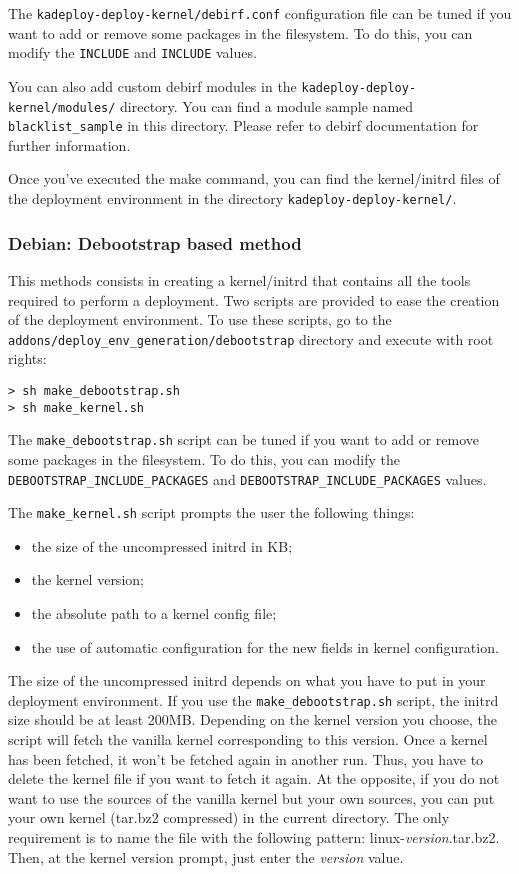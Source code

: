\documentclass[a4wide,10pt,oneside]{book}
\begin{document}
The \texttt{kadeploy-deploy-kernel/debirf.conf} configuration file can be tuned if you want to add or remove some packages in the filesystem. To do this, you can modify the \texttt{INCLUDE} and \texttt{INCLUDE} values.

You can also add custom debirf modules in the \texttt{kadeploy-deploy-kernel/modules/} directory. You can find a module sample named \texttt{blacklist\_sample} in this directory. Please refer to debirf documentation for further information.

Once you've executed the make command, you can find the kernel/initrd files of the deployment environment in the directory \texttt{kadeploy-deploy-kernel/}.

\subsubsection{Debian: Debootstrap based method}
This methods consists in creating a kernel/initrd that contains all the tools required to perform a deployment. Two scripts are provided to ease the creation of the deployment environment. To use these scripts, go to the \texttt{addons/deploy\_env\_generation/debootstrap} directory and execute with root rights:
\begin{small}
\begin{verbatim}
> sh make_debootstrap.sh
> sh make_kernel.sh
\end{verbatim}
\end{small}

The \texttt{make\_debootstrap.sh} script can be tuned if you want to add or remove some packages in the filesystem. To do this, you can modify the \texttt{DEBOOTSTRAP\_INCLUDE\_PACKAGES} and \texttt{DEBOOTSTRAP\_INCLUDE\_PACKAGES} values.

The \texttt{make\_kernel.sh} script prompts the user the following things:
\begin{itemize}
\item the size of the uncompressed initrd in KB;
\item the kernel version;
\item the absolute path to a kernel config file;
\item the use of automatic configuration for the new fields in kernel configuration.
\end{itemize}

The size of the uncompressed initrd depends on what you have to put in your deployment environment. If you use the \texttt{make\_debootstrap.sh} script, the initrd size should be at least 200MB.
Depending on the kernel version you choose, the script will fetch the vanilla kernel corresponding to this version. Once a kernel has been fetched, it won't be fetched again in another run. Thus, you have to delete the kernel file if you want to fetch it again. At the opposite, if you do not want to use the sources of the vanilla kernel but your own sources, you can put your own kernel (tar.bz2 compressed) in the current directory. The only requirement is to name the file with the following pattern: linux-\textit{version}.tar.bz2. Then, at the kernel version prompt, just enter the \textit{version} value.
\end{document}
